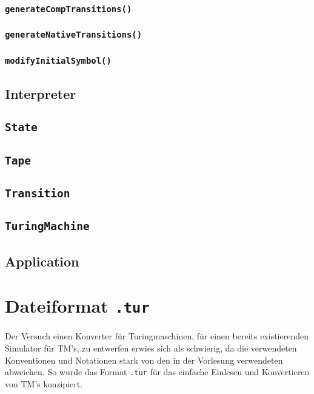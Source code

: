 \documentclass[10pt, a4paper]{article}
\newcommand{\ilc}{\texttt}
\begin{document}
\subsubsection*{\ilc{generateCompTransitions()}}
\subsubsection*{\ilc{generateNativeTransitions()}}
\subsubsection*{\ilc{modifyInitialSymbol()}}


\subsection*{Interpreter}
\subsection*{\ilc{State}}
\subsection*{\ilc{Tape}}
\subsection*{\ilc{Transition}}
\subsection*{\ilc{TuringMachine}}

\subsection*{Application}


\section*{Dateiformat \ilc{.tur}}
\paragraph*{}
Der Versuch einen Konverter für Turingmaschinen, für einen bereits existierenden Simulator für TM's, zu entwerfen erwies sich als schwierig, da die verwendeten Konventionen und Notationen stark von den in der Vorlesung verwendeten abweichen. So wurde das Format \ilc{.tur} für das einfache Einlesen und Konvertieren von TM's konzipiert.
\end{document}

